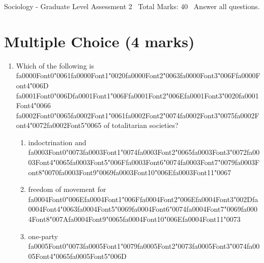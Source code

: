 \documentclass[12pt]{article}
\begin{document}
\begin{center}
Sociology - Graduate Level Assessment 2 \
Total Marks: 40 \
Answer all questions.
\end{center}

\section*{Multiple Choice (4 marks)}
\begin{enumerate}[label=\arabic*.]
\item Which of the following is {\csname fa0000Font0\endcsname\char"0061}{\csname fa0000Font1\endcsname\char"0020}{\csname fa0000Font2\endcsname\char"0063}{\csname fa0000Font3\endcsname\char"006F}{\csname fa0000Font4\endcsname\char"006D} {\csname fa0001Font0\endcsname\char"006D}{\csname fa0001Font1\endcsname\char"006F}{\csname fa0001Font2\endcsname\char"006E}{\csname fa0001Font3\endcsname\char"0020}{\csname fa0001Font4\endcsname\char"0066} {\csname fa0002Font0\endcsname\char"0065}{\csname fa0002Font1\endcsname\char"0061}{\csname fa0002Font2\endcsname\char"0074}{\csname fa0002Font3\endcsname\char"0075}{\csname fa0002Font4\endcsname\char"0072}{\csname fa0002Font5\endcsname\char"0065} of totalitarian societies?
\begin{enumerate}[label=(\alph*)]
    \item indoctrination and {\csname fa0003Font0\endcsname\char"0073}{\csname fa0003Font1\endcsname\char"0074}{\csname fa0003Font2\endcsname\char"0065}{\csname fa0003Font3\endcsname\char"0072}{\csname fa0003Font4\endcsname\char"0065}{\csname fa0003Font5\endcsname\char"006F}{\csname fa0003Font6\endcsname\char"0074}{\csname fa0003Font7\endcsname\char"0079}{\csname fa0003Font8\endcsname\char"0070}{\csname fa0003Font9\endcsname\char"0069}{\csname fa0003Font10\endcsname\char"006E}{\csname fa0003Font11\endcsname\char"0067}
    \item freedom of movement for {\csname fa0004Font0\endcsname\char"006E}{\csname fa0004Font1\endcsname\char"006F}{\csname fa0004Font2\endcsname\char"006E}{\csname fa0004Font3\endcsname\char"002D}{\csname fa0004Font4\endcsname\char"0063}{\csname fa0004Font5\endcsname\char"0069}{\csname fa0004Font6\endcsname\char"0074}{\csname fa0004Font7\endcsname\char"0069}{\csname fa0004Font8\endcsname\char"007A}{\csname fa0004Font9\endcsname\char"0065}{\csname fa0004Font10\endcsname\char"006E}{\csname fa0004Font11\endcsname\char"0073}
    \item one-party {\csname fa0005Font0\endcsname\char"0073}{\csname fa0005Font1\endcsname\char"0079}{\csname fa0005Font2\endcsname\char"0073}{\csname fa0005Font3\endcsname\char"0074}{\csname fa0005Font4\endcsname\char"0065}{\csname fa0005Font5\endcsname\char"006D}

\end{enumerate}
\end{enumerate}
\end{document}
